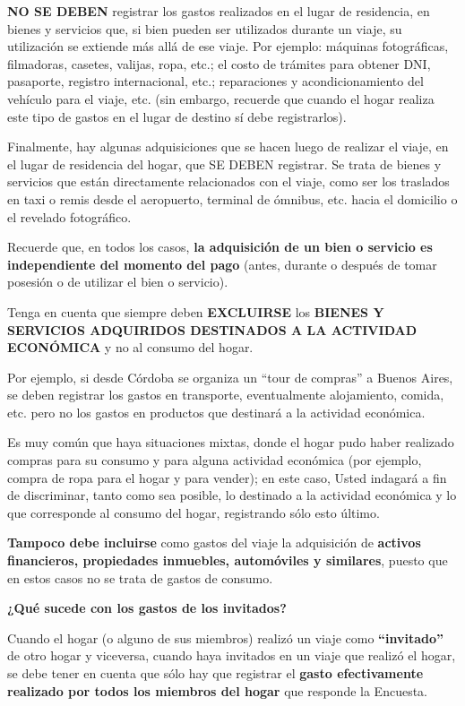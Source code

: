 \documentclass[
  openany]{book}
\begin{document}
\textbf{NO SE DEBEN} registrar los gastos realizados en el lugar de residencia, en bienes y servicios que, si bien pueden ser utilizados durante un viaje, su utilización se extiende más allá de ese viaje. Por ejemplo: máquinas fotográficas, filmadoras, casetes, valijas, ropa, etc.; el costo de trámites para obtener DNI, pasaporte, registro internacional, etc.; reparaciones y acondicionamiento del vehículo para el viaje, etc. (sin embargo, recuerde que cuando el hogar realiza este tipo de gastos en el lugar de destino sí debe registrarlos).

Finalmente, hay algunas adquisiciones que se hacen luego de realizar el viaje, en el lugar de residencia del hogar, que SE DEBEN registrar. Se trata de bienes y servicios que están directamente relacionados con el viaje, como ser los traslados en taxi o remis desde el aeropuerto, terminal de ómnibus, etc. hacia el domicilio o el revelado fotográfico.

Recuerde que, en todos los casos, \textbf{la adquisición de un bien o servicio es independiente del momento del pago} (antes, durante o después de tomar posesión o de utilizar el bien o servicio).

Tenga en cuenta que siempre deben \textbf{EXCLUIRSE} los \textbf{BIENES Y SERVICIOS ADQUIRIDOS DESTINADOS A LA ACTIVIDAD ECONÓMICA} y no al consumo del hogar.

Por ejemplo, si desde Córdoba se organiza un ``tour de compras'' a Buenos Aires, se deben registrar los gastos en transporte, eventualmente alojamiento, comida, etc. pero no los gastos en productos que destinará a la actividad económica.

Es muy común que haya situaciones mixtas, donde el hogar pudo haber realizado compras para su consumo y para alguna actividad económica (por ejemplo, compra de ropa para el hogar y para vender); en este caso, Usted indagará a fin de discriminar, tanto como sea posible, lo destinado a la actividad económica y lo que corresponde al consumo del hogar, registrando sólo esto último.

\textbf{Tampoco debe incluirse} como gastos del viaje la adquisición de \textbf{activos financieros, propiedades inmuebles, automóviles y similares}, puesto que en estos casos no se trata de gastos de consumo.

\textbf{¿Qué sucede con los gastos de los invitados?}

Cuando el hogar (o alguno de sus miembros) realizó un viaje como \textbf{``invitado''} de otro hogar y viceversa, cuando haya invitados en un viaje que realizó el hogar, se debe tener en cuenta que sólo hay que registrar el \textbf{gasto efectivamente realizado por todos los miembros del hogar} que responde la Encuesta.
\end{document}
